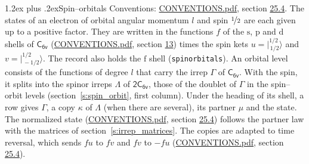 \documentclass[10pt,a4paper]{article}
\makeatletter
\renewcommand\section{\@startsection{section}{1}{\z@}{-3ex plus -1ex minus -.2ex}%
  {1.2ex plus .2ex}{\normalfont\large\sffamily\bfseries\color{parttitle}}}
\numberwithin{equation}{section}
\newcommand{\grp}[1]{\mathsf{#1}}
\newcommand{\orbital}[1]{\mathrm{#1}}
\newcommand{\mult}{\kappa}
\newcommand{\intx}{\mu}
\newcommand{\jm}[2]{\bigl\lvert{}^{#1}_{\,#2}\bigr\rangle}
\makeatother
\begin{document}
\section{Spin--orbitals}\label{s:spin_orbitals}
Conventions: \href{../../CONVENTIONS.pdf}{CONVENTIONS.pdf}, section \href{../../CONVENTIONS.pdf\#conv.25.4}{25.4}.
\leavevmode\label{n:index.orbital.l}The states of an electron of orbital angular momentum $l$ and spin $\nicefrac{1}{2}$ are each given up to a positive factor. \label{n:local.spinor.uv}\label{n:local.function.f}They are written in the functions $f$ of the $\orbital{s}$, $\orbital{p}$ and $\orbital{d}$ shells of \href{../../../rotation/data/pdf/C6v.pdf}{$\grp{C_{6v}}$} (\href{../../CONVENTIONS.pdf}{CONVENTIONS.pdf}, section \href{../../../rotation/CONVENTIONS.pdf\#conv.13}{13}) times the spin kets $u = \jm{1/2}{1/2}$ and $v = \jm{1/2}{-1/2}$. The record also holds the $\orbital{f}$ shell (\texttt{spinorbitals}). An orbital level consists of the functions of degree $l$ that carry the irrep $\Gamma$ of \href{../../../rotation/data/pdf/C6v.pdf}{$\grp{C_{6v}}$}. With the spin, it splits into the spinor irreps $\Lambda$ of $\grp{2C_{6v}}$, those of the doublet of $\Gamma$ in the spin--orbit levels (section~\ref{s:spin_orbit}, first column). \label{n:head.state}Under the heading of its shell, a row gives $\Gamma$, a copy $\mult$ of $\Lambda$ (when there are several), its partner $\intx$ and the state. The normalized state (\href{../../CONVENTIONS.pdf}{CONVENTIONS.pdf}, section \href{../../CONVENTIONS.pdf\#conv.25.4}{25.4}) follows the partner law with the matrices of section~\ref{s:irrep_matrices}. The copies are adapted to time reversal, which sends $f u$ to $f v$ and $f v$ to $-f u$ (\href{../../CONVENTIONS.pdf}{CONVENTIONS.pdf}, section \href{../../CONVENTIONS.pdf\#conv.25.4}{25.4}).
\end{document}
